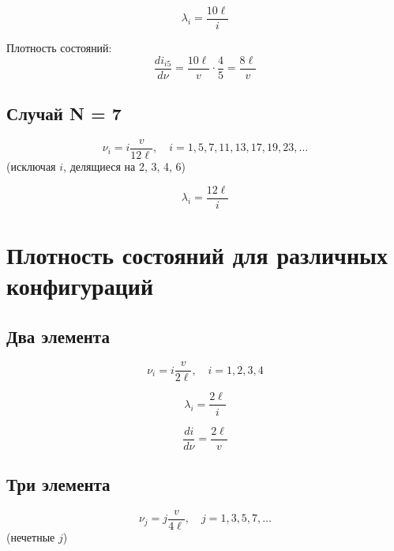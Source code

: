 \documentclass[12pt,a4paper]{article}
\begin{document}
\begin{equation}
\lambda_i = \frac{10\ell}{i}
\end{equation}

Плотность состояний:
\begin{equation}
\frac{di_{i5}}{d\nu} = \frac{10\ell}{v} \cdot \frac{4}{5} = \frac{8\ell}{v}
\end{equation}

\subsection{Случай N = 7}

\begin{equation}
\nu_i = i \frac{v}{12\ell}, \quad i = 1, 5, 7, 11, 13, 17, 19, 23, \ldots
\end{equation}
(исключая $i$, делящиеся на 2, 3, 4, 6)

\begin{equation}
\lambda_i = \frac{12\ell}{i}
\end{equation}

\section{Плотность состояний для различных конфигураций}

\subsection{Два элемента}

\begin{equation}
\nu_i = i \frac{v}{2\ell}, \quad i = 1, 2, 3, 4
\end{equation}

\begin{equation}
\lambda_i = \frac{2\ell}{i}
\end{equation}

\begin{equation}
\frac{di}{d\nu} = \frac{2\ell}{v}
\end{equation}

\subsection{Три элемента}

\begin{equation}
\nu_j = j \frac{v}{4\ell}, \quad j = 1, 3, 5, 7, \ldots
\end{equation}
(нечетные $j$)
\end{document}
